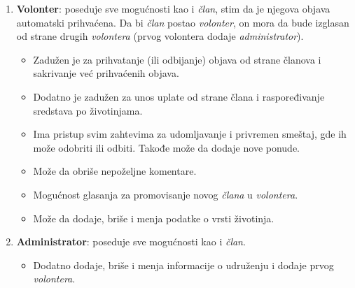 \begin{enumerate}
\begin{itemize}
    \end{itemize}
    \item \textbf{Volonter}: poseduje sve mogućnosti kao i \textit{član}, stim da je njegova objava automatski prihvaćena. Da bi \textit{član} postao \textit{volonter}, on mora
    da bude izglasan od strane drugih \textit{volontera} (prvog volontera dodaje \textit{administrator}). 
    \begin{itemize}
        \item Zadužen je za prihvatanje (ili odbijanje) objava od strane članova i sakrivanje već prihvaćenih objava.
        \item Dodatno je zadužen za unos uplate od strane člana i raspoređivanje sredstava po životinjama.
        \item Ima pristup svim zahtevima za udomljavanje i privremen smeštaj, gde ih može odobriti ili odbiti. Takođe može da dodaje nove ponude.
        \item Može da obriše nepoželjne komentare.
        \item Mogućnost glasanja za promovisanje novog \textit{člana} u \textit{volontera}.
        \item Može da dodaje, briše i menja podatke o vrsti životinja.
    \end{itemize}
    \item \textbf{Administrator}: poseduje sve mogućnosti kao i \textit{član}. 
    \begin{itemize}
        \item Dodatno dodaje, briše i menja informacije o udruženju i dodaje prvog \textit{volontera}.
    \end{itemize}
    
\end{enumerate}